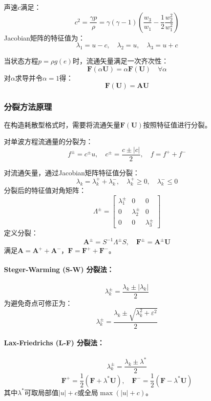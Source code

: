 \documentclass[12pt,a4paper]{article}
\begin{document}
声速$c$满足：
$$
c^{2} = \frac{\gamma p}{\rho} = \gamma(\gamma - 1)\left(\frac{w_{3}}{w_{1}} - \frac{1}{2}\frac{w_{2}^{2}}{w_{1}^{2}}\right)
$$
Jacobian矩阵的特征值为：
$$
\lambda_{1} = u - c, \quad \lambda_{2} = u, \quad \lambda_{3} = u + c
$$

当状态方程$p = \rho g(e)$时，流通矢量满足一次齐次性：
$$
\mathbf{F}(\alpha\mathbf{U}) = \alpha\mathbf{F}(\mathbf{U}) \quad \forall \alpha
$$
对$\alpha$求导并令$\alpha = 1$得：
$$
\mathbf{F}(\mathbf{U}) = \mathbf{A}\mathbf{U}
$$

\subsubsection{分裂方法原理}
在构造耗散型格式时，需要将流通矢量$\mathbf{F}(\mathbf{U})$按照特征值进行分裂。

对单波方程流通量的分裂为：
$$
f^{\pm} = c^{\pm}u, \quad c^{\pm} = \frac{c \pm |c|}{2}, \quad f = f^{+} + f^{-}
$$

对流通矢量，通过Jacobian矩阵特征值分裂：
$$
\lambda_{k} = \lambda_{k}^{+} + \lambda_{k}^{-}, \quad \lambda_{k}^{+} \geq 0, \quad \lambda_{k}^{-} \leq 0
$$
分裂后的特征值对角矩阵：
$$
\Lambda^{\pm} = \begin{bmatrix}
\lambda_{1}^{\pm} & 0 & 0 \\
0 & \lambda_{2}^{\pm} & 0 \\
0 & 0 & \lambda_{3}^{\pm}
\end{bmatrix}
$$
定义分裂：
$$
\mathbf{A}^{\pm} = S^{-1}\Lambda^{\pm}S, \quad \mathbf{F}^{\pm} = \mathbf{A}^{\pm}\mathbf{U}
$$
满足$\mathbf{A} = \mathbf{A}^{+} + \mathbf{A}^{-}$，$\mathbf{F} = \mathbf{F}^{+} + \mathbf{F}^{-}$。

\paragraph{Steger-Warming (S-W) 分裂法：}
$$
\lambda_{k}^{\pm} = \frac{\lambda_{k} \pm |\lambda_{k}|}{2}
$$
为避免奇点可修正为：
$$
\lambda_{k}^{\pm} = \frac{\lambda_{k} \pm \sqrt{\lambda_{k}^{2} + \varepsilon^{2}}}{2}
$$

\paragraph{Lax-Friedrichs (L-F) 分裂法：}
$$
\lambda_{k}^{\pm} = \frac{\lambda_{k} \pm \lambda^{*}}{2}
$$
$$
\mathbf{F}^{+} = \frac{1}{2}\left(\mathbf{F} + \lambda^{*}\mathbf{U}\right), \quad \mathbf{F}^{-} = \frac{1}{2}\left(\mathbf{F} - \lambda^{*}\mathbf{U}\right)
$$
其中$\lambda^{*}$可取局部值$|u| + c$或全局$\max(|u| + c)$。
\end{document}
